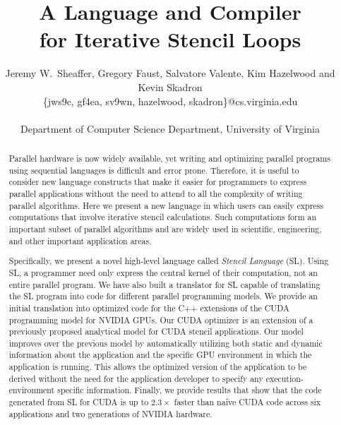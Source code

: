 \documentclass{sig-alternate}
\begin{document}
\setlength{\pdfpageheight}{\paperheight}
\setlength{\pdfpagewidth}{\paperwidth}

\title{A Language and Compiler\\for Iterative Stencil Loops}

\author{Jeremy W.~Sheaffer, Gregory Faust, Salvatore Valente, Kim Hazelwood
  and Kevin Skadron\\
  \{jws9c, gf4ea, sv9wn, hazelwood, skadron\}@cs.virginia.edu\\\\
  Department of Computer Science Department, University of Virginia}

\maketitle

\begin{abstract}

Parallel hardware is now widely available, yet writing and optimizing
parallel programs using sequential languages is difficult and error prone.
Therefore, it is useful to consider new language constructs that make it
easier for programmers to express parallel applications without the need to
attend to all the complexity of writing parallel algorithms.  Here we present
a new language in which users can easily express computations that involve
iterative stencil calculations.  Such computations form an important subset
of parallel algorithms and are widely used in scientific, engineering, and
other important application areas.

Specifically, we present a novel high-level language called {\em Stencil
  Language} (SL).  Using SL, a programmer need only express the central
kernel of their computation, not an entire parallel program.  We have also
built a translator for SL capable of translating the SL program into code for
different parallel programming models.  We provide an initial translation
into optimized code for the C++ extensions of the CUDA programming model for
NVIDIA GPUs.  Our CUDA optimizer is an extension of a previously proposed
analytical model for CUDA stencil applications.  Our model improves over the
previous model by automatically utilizing both static and dynamic information
about the application and the specific GPU environment in which the
application is running.  This allows the optimized version of the application
to be derived without the need for the application developer to specify any
execution-environment specific information.  Finally, we provide results that
show that the code generated from SL for CUDA is up to $2.3\times$ faster
than na\"{i}ve CUDA code across six applications and two generations of
NVIDIA hardware.

\end{abstract}
\end{document}
